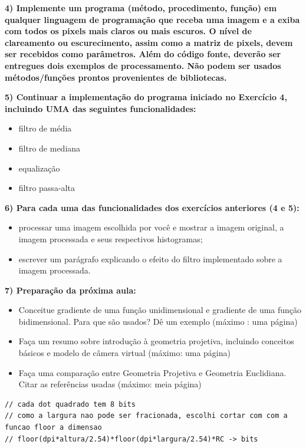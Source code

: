 \documentclass[a4paper]{sbgames}               %
\begin{document}
\textbf{4) Implemente um programa (método, procedimento, função) em qualquer
linguagem de programação que receba uma imagem e a exiba com todos
os pixels mais claros ou mais escuros. O nível de clareamento ou
escurecimento, assim como a matriz de pixels, devem ser recebidos
como parâmetros. Além do código fonte, deverão ser entregues dois
exemplos de processamento. Não podem ser usados métodos/funções
prontos provenientes de bibliotecas.}

\textbf{5) Continuar a implementação do programa iniciado no Exercício 4, incluindo UMA das seguintes funcionalidades:}

\begin{itemize}
\item filtro de média
\item filtro de mediana
\item equalização
\item filtro passa-alta
\end{itemize}

\textbf{6)  Para cada uma das funcionalidades dos exercícios anteriores (4 e 5):}
\begin{itemize}
\item processar uma imagem escolhida por você e mostrar a imagem original, a imagem processada e seus respectivos histogramas;
\item escrever um parágrafo explicando o efeito do filtro implementado sobre a
imagem processada.
\end{itemize}

\textbf{7) Preparação da próxima aula:}
\begin{itemize}
\item Conceitue gradiente de uma função unidimensional e gradiente de uma função bidimensional. Para que são usados? Dê um exemplo (máximo :
uma página)
\item Faça um resumo sobre introdução à geometria projetiva, incluindo
conceitos básicos e modelo de câmera virtual (máximo: uma página)
\item Faça uma comparação entre Geometria Projetiva e Geometria Euclidiana.
Citar as referências usadas (máximo: meia página)
\end{itemize}

\begin{lstlisting}
// cada dot quadrado tem 8 bits
// como a largura nao pode ser fracionada, escolhi cortar com com a funcao floor a dimensao
// floor(dpi*altura/2.54)*floor(dpi*largura/2.54)*RC -> bits
\end{lstlisting}
\end{document}
